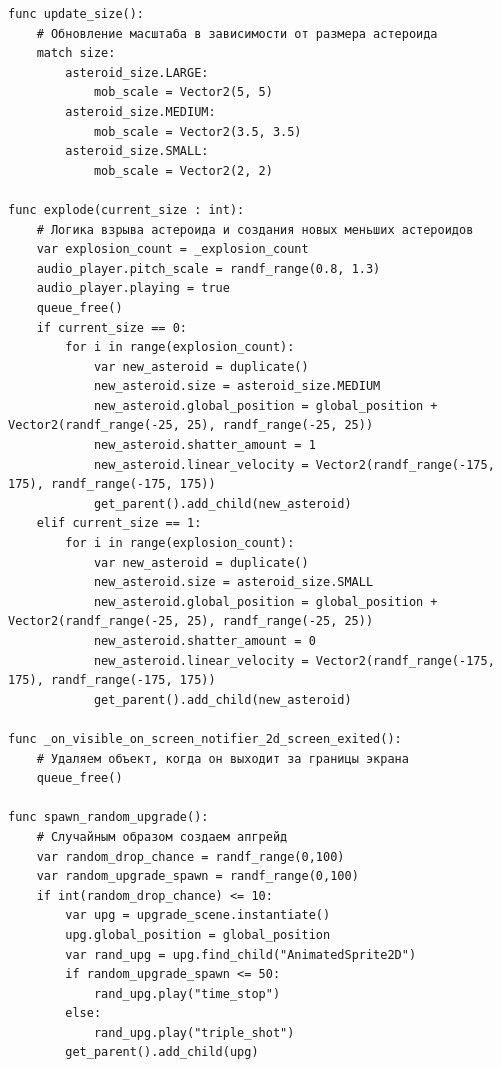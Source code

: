 \begin{code}
\begin{verbatim}
func update_size():
    # Обновление масштаба в зависимости от размера астероида
    match size:
        asteroid_size.LARGE:
            mob_scale = Vector2(5, 5)
        asteroid_size.MEDIUM:
            mob_scale = Vector2(3.5, 3.5)
        asteroid_size.SMALL:
            mob_scale = Vector2(2, 2)

func explode(current_size : int):
    # Логика взрыва астероида и создания новых меньших астероидов
    var explosion_count = _explosion_count
    audio_player.pitch_scale = randf_range(0.8, 1.3)
    audio_player.playing = true
    queue_free()
    if current_size == 0:
        for i in range(explosion_count):
            var new_asteroid = duplicate()
            new_asteroid.size = asteroid_size.MEDIUM
            new_asteroid.global_position = global_position + Vector2(randf_range(-25, 25), randf_range(-25, 25))
            new_asteroid.shatter_amount = 1
            new_asteroid.linear_velocity = Vector2(randf_range(-175, 175), randf_range(-175, 175))
            get_parent().add_child(new_asteroid)
    elif current_size == 1:
        for i in range(explosion_count):
            var new_asteroid = duplicate()
            new_asteroid.size = asteroid_size.SMALL
            new_asteroid.global_position = global_position + Vector2(randf_range(-25, 25), randf_range(-25, 25))
            new_asteroid.shatter_amount = 0
            new_asteroid.linear_velocity = Vector2(randf_range(-175, 175), randf_range(-175, 175))
            get_parent().add_child(new_asteroid)

func _on_visible_on_screen_notifier_2d_screen_exited():
    # Удаляем объект, когда он выходит за границы экрана
    queue_free()

func spawn_random_upgrade():
    # Случайным образом создаем апгрейд
    var random_drop_chance = randf_range(0,100)
    var random_upgrade_spawn = randf_range(0,100)
    if int(random_drop_chance) <= 10:
        var upg = upgrade_scene.instantiate()
        upg.global_position = global_position
        var rand_upg = upg.find_child("AnimatedSprite2D")
        if random_upgrade_spawn <= 50:
            rand_upg.play("time_stop")
        else:
            rand_upg.play("triple_shot")
        get_parent().add_child(upg)


\end{verbatim}
\end{code}

